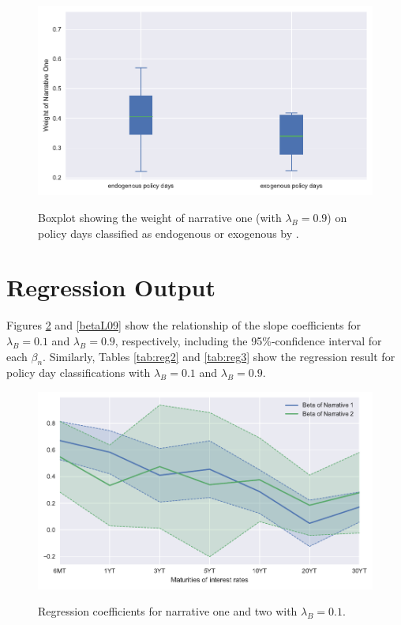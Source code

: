 \documentclass[11pt,a4paper,english,oneside]{book}
\numberwithin{equation}{chapter}
\begin{document}

\begin{figure}
	\caption{Boxplot showing the weight of narrative one (with $\lambda_B=0.9$) on policy days classified as endogenous or exogenous by \citet[p. 11]{Ellingsen.2003}.}
	\centering
	\includegraphics[scale=1]{Images/boxplot_Lamb_0_9.pdf}
	\label{boxplotL09}
\end{figure}

\section{Regression Output}\label{AppendixD2}

Figures \ref{betaL01} and \ref{betaL09} show the relationship of the slope coefficients for $\lambda_B=0.1$ and $\lambda_B=0.9$, respectively, including the 95\%-confidence interval for each $\beta_n$. Similarly, Tables \ref{tab:reg2} and \ref{tab:reg3}  show the regression result for policy day classifications with $\lambda_B=0.1$ and $\lambda_B=0.9$.

\begin{figure}
	\caption{Regression coefficients for narrative one and two with $\lambda_B=0.1$.}
	\centering
	\includegraphics[scale=1]{Images/betasLamb0_1.pdf}
	\label{betaL01}
\end{figure}
\end{document}
